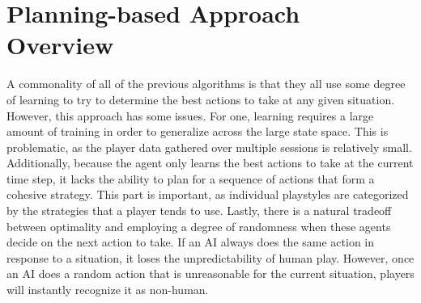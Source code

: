 \chapter{Planning-based Approach Overview}

\label{Chapter3} %

A commonality of all of the previous algorithms is that they all use some degree of learning to try to determine the best actions to take at any given situation. However, this approach has some issues. For one, learning requires a large amount of training in order to generalize across the large state space. This is problematic, as the player data gathered over multiple sessions is relatively small. Additionally, because the agent only learns the best actions to take at the current time step, it lacks the ability to plan for a sequence of actions that form a cohesive strategy. This part is important, as individual playstyles are categorized by the strategies that a player tends to use. Lastly, there is a natural tradeoff between optimality and employing a degree of randomness when these agents decide on the next action to take. If an AI always does the same action in response to a situation, it loses the unpredictability of human play. However, once an AI does a random action that is unreasonable for the current situation, players will instantly recognize it as non-human. 

